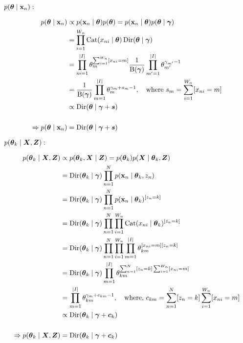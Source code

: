 \begin{enumerate}
    \underline{$p(\boldsymbol{\theta} \mid \bold{x}_n):$}
    
    \begin{align*}
        p(\boldsymbol{\theta} \mid \bold{x}_n)  &\propto p(\bold{x}_n \mid \boldsymbol{\theta}) p(\boldsymbol{\theta}) = p(\bold{x}_n \mid \boldsymbol{\theta}) p(\boldsymbol{\theta} \mid \boldsymbol{\gamma}) 
        \\
        &= \prod_{i=1}^{W_n}\operatorname{Cat}(x_{ni}\mid \boldsymbol{\theta})\operatorname{Dir}(\boldsymbol{\theta}  \mid \boldsymbol{\gamma})
        \\
        &= \prod_{m=1}^{\vert I \vert} \theta_m^{\sum_{i=1}^{W_n}[x_{ni} = m]} \frac{1}{\operatorname{B}(\boldsymbol{\gamma})} \prod_{m'=1}^{\vert I\vert} \theta_{m'}^{\gamma_{m'} - 1}
        \\
        &= \frac{1}{\operatorname{B(\boldsymbol{\gamma})}} \prod_{m=1}^{\vert I \vert} \theta_m^{\gamma_m + s_m -1}, \quad \text{where }  s_m = \sum_{i=1}^{W_n}[x_{ni} = m]
        \\
        &\propto \operatorname{Dir}(\boldsymbol{\theta}  \mid\boldsymbol{\gamma} + \boldsymbol{s})
        \\\\
        \Rightarrow p(\boldsymbol{\theta} \mid  \bold{x}_n) &= \operatorname{Dir}(\boldsymbol{\theta} \mid \boldsymbol{\gamma} + \boldsymbol{s})
    \end{align*}
    
    \newpage
    \underline{$p(\boldsymbol{\theta}_k \mid \boldsymbol{X}, \boldsymbol{Z}):$}

    \begin{align*}
        p(\boldsymbol{\theta}_k \mid \boldsymbol{X}, \boldsymbol{Z})  &\propto p(\boldsymbol{\theta}_k, \boldsymbol{X}\mid \boldsymbol{Z})= p(\boldsymbol{\theta}_k) p(\boldsymbol{X} \mid \boldsymbol{\theta}_k, \boldsymbol{Z}) 
        \\
        &= \operatorname{Dir}(\boldsymbol{\theta}_k  \mid \boldsymbol{\gamma}) \prod_{n=1}^N p(\bold{x}_n \mid \boldsymbol{\theta}_k, z_n)
        \\
        &= \operatorname{Dir}(\boldsymbol{\theta}_k  \mid \boldsymbol{\gamma}) \prod_{n=1}^N p(\bold{x}_n \mid \boldsymbol{\theta}_k)^{[z_n = k]}
        \\
        &= \operatorname{Dir}(\boldsymbol{\theta}_k  \mid \boldsymbol{\gamma}) \prod_{n=1}^N \prod_{i=1}^{W_n}\operatorname{Cat}(x_{ni} \mid \boldsymbol{\theta}_k)^{[z_n = k]}
        \\
        &= \operatorname{Dir}(\boldsymbol{\theta}_k  \mid \boldsymbol{\gamma}) \prod_{n=1}^N \prod_{i=1}^{W_n} \prod_{m=1}^{\vert I \vert}\theta_{km}^{[x_{ni} = m][z_n = k]}
        \\
        &= \operatorname{Dir}(\boldsymbol{\theta}_k  \mid \boldsymbol{\gamma}) \prod_{m=1}^{\vert I \vert} \theta_{km}^{\sum_{n=1}^N[z_n = k]\sum_{i=1}^{W_n}[x_{ni} = m]}
        \\
        &= \prod_{m=1}^{\vert I \vert} \theta_{km}^{\gamma_m + c_{km} - 1}, \quad \text{where, } c_{km} = \sum_{n=1}^N[z_n = k]\sum_{i=1}^{W_n}[x_{ni} = m]
        \\
        &\propto \operatorname{Dir}(\boldsymbol{\theta}_k \mid \boldsymbol{\gamma} + \boldsymbol{c}_k)
        \\\\
        \Rightarrow p(\boldsymbol{\theta}_k \mid \boldsymbol{X}, \boldsymbol{Z}) &= \operatorname{Dir}(\boldsymbol{\theta}_k \mid\boldsymbol{\gamma} + \boldsymbol{c}_k)
    \end{align*}
    

\end{enumerate}
